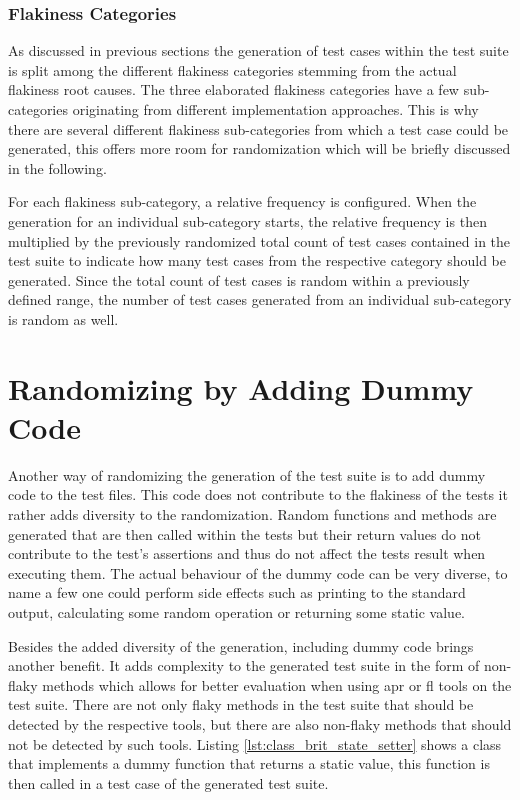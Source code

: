 \documentclass[
fancyheadings, %
%
%
]{stsreprt}
\begin{document}
\subsubsection{Flakiness Categories}
As discussed in previous sections the generation of test cases within the test suite is split among the different flakiness categories stemming from the actual flakiness root causes. 
The three elaborated flakiness categories have a few sub-categories originating from different implementation approaches. 
This is why there are several different flakiness sub-categories from which a test case could be generated, this offers more room for randomization which will be briefly discussed in the following. \par

For each flakiness sub-category, a relative frequency is configured. 
When the generation for an individual sub-category starts, the relative frequency is then multiplied by the previously randomized total count of test cases contained in the test suite to indicate how many test cases from the respective category should be generated. 
Since the total count of test cases is random within a previously defined range, the number of test cases generated from an individual sub-category is random as well. 



\section{Randomizing by Adding Dummy Code}
Another way of randomizing the generation of the test suite is to add dummy code to the test files. 
This code does not contribute to the flakiness of the tests it rather adds diversity to the randomization. 
Random functions and methods are generated that are then called within the tests but their return values do not contribute to the test's assertions and thus do not affect the tests result when executing them. 
The actual behaviour of the dummy code can be very diverse, to name a few one could perform side effects such as printing to the standard output, calculating some random operation or returning some static value. \par
Besides the added diversity of the generation, including dummy code brings another benefit.
It adds complexity to the generated test suite in the form of non-flaky methods which allows for better evaluation when using \acrshort{apr} or \acrshort{fl} tools on the test suite. 
There are not only flaky methods in the test suite that should be detected by the respective tools, but there are also non-flaky methods that should not be detected by such tools.
Listing \ref{lst:class_brit_state_setter} shows a class that implements a dummy function that returns a static value, this function is then called in a test case of the generated test suite. 
\end{document}

